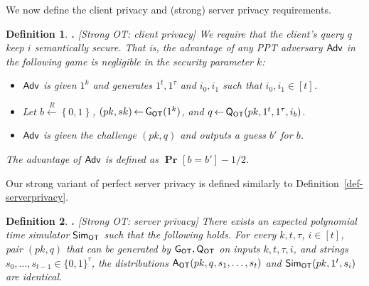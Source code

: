 \documentclass[11pt]{article}
\newcommand{\genot}{{\sf G_{OT}}}
\newcommand{\queot}{{\sf Q_{OT}}}
\newcommand{\ansot}{{\sf A_{OT}}}
\newcommand{\simot}{{\sf Sim_{OT}}}
\newcommand{\otl}{{\tau}}
\newcommand{\adv}{{\sf Adv }}
\newcommand{\set}[1]{\left\{#1\right\}}
\newtheorem{DEFINITION}{Definition}[section]
\newenvironment{definition}{\begin{DEFINITION} \hspace{-.85em} {\bf .} \rm}%
	{\end{DEFINITION}}
\newcommand{\from}{{\,\leftarrow\,}}
\newcommand{\prob}[2][]{{\mathop{\mathbf{Pr}}_{#1}\!{\left[{#2}\right]}}}
\newcommand{\usamp}[2]{#1\stackrel{R}{\leftarrow}#2}
\newcommand{\bools}[1][]{{\set{0,1}}^{#1}}
\newcommand{\bp}{\mbox{BP}\;}
\newcommand{\ot}{\mbox{OT}\;}
\newcommand{\ideal}{{\sf Ideal}}
\newcommand{\eps}{{\epsilon}}
\begin{document}
We now define the client privacy and (strong) server privacy
requirements.
\begin{definition}[Strong OT: client privacy]
We require that the client's query $q$ keep $i$ semantically secure.
That is, the advantage of any PPT adversary $\adv$ in the following
game is negligible in the security parameter $k$:
\begin{itemize}
\item $\adv$ is given $1^k$ and generates $1^t, 1^\otl$ and
$i_0,i_1$ such that $i_0,i_1\in{[t]}$.
\item Let $\usamp{b}{\bools}$, $(pk,sk)\from \genot(1^k)$,
and $q\from \queot(pk,1^t,1^\otl,i_b)$.
\item $\adv$ is given the challenge $(pk,q)$ and outputs a guess
$b'$ for $b$.
\end{itemize}
The advantage of $\adv$ is defined as $\prob{b=b'}-1/2$.
\end{definition}
Our strong variant of perfect server privacy is defined similarly to
Definition~\ref{def-serverprivacy}.
\begin{definition}[Strong OT: server privacy]
\label{def-ot-serv-priv} There exists an expected polynomial time
simulator $\simot$ such that the following holds. For every
$k,t,\otl$, $i\in[t]$, pair $(pk,q)$ that can be generated by
$\genot,\queot$ on inputs $k,t,\otl,i$, and strings
$s_0,\ldots,s_{t-1}\in\{0,1\}^\otl$, the distributions
$\ansot(pk,q,s_1,\ldots,s_t)$ and $\simot(pk, 1^t, s_i)$ are
identical.
\end{definition}

%
\end{document}

